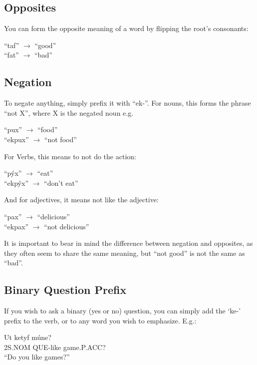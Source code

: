 \documentclass{book}
\begin{document}
\subsection{Opposites}
You can form the opposite meaning of a word by flipping the root's consonants:

\begin{center}
    ``taf'' $\rightarrow$ ``good'' \\
    ``fat'' $\rightarrow$ ``bad''
\end{center}

\subsection{Negation}
To negate anything, simply prefix it with ``ek-''. For nouns, this forms the phrase ``not X'', where X
is the negated noun e.g.

\begin{center}
    ``pux'' $\rightarrow$ ``food'' \\
    ``ekpux'' $\rightarrow$ ``not food''
\end{center}

For Verbs, this means to not do the action:

\begin{center}
    ``pýx'' $\rightarrow$ ``eat'' \\
    ``ekpýx'' $\rightarrow$ ``don't eat''
\end{center}

And for adjectives, it means not like the adjective:

\begin{center}
    ``pax'' $\rightarrow$ ``delicious'' \\
    ``ekpax'' $\rightarrow$ ``not delicious''
\end{center}

It is important to bear in mind the difference between negation and opposites, as they often
seem to share the same meaning, but ``not good'' is not the same as ``bad''.

\subsection{Binary Question Prefix}
If you wish to ask a binary (yes or no) question, you can simply add the `ke-' prefix to the
verb, or to any word you wish to emphasize. E.g.:

\begin{exe}
    \ex
    \gll Ut ketyf múne?\\
    2S.NOM QUE-like game.P.ACC? \\
    \glt ``Do you like games?''
\end{exe}
\end{document}
